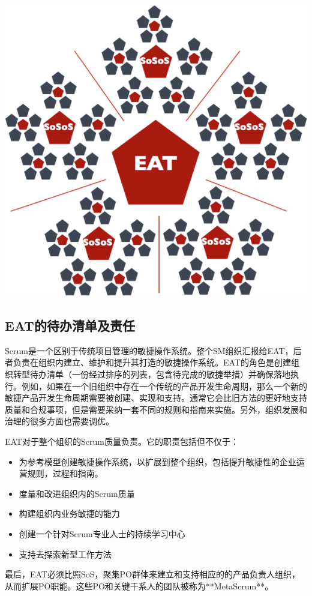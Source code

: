 \documentclass[12pt,a4paper,parskip=full]{scrartcl}
\begin{document}
\begin{CJK*}{UTF8}{gbsn}
\includegraphics[width=1.0\linewidth]{SoS-EAT.png}

\subsection{EAT的待办清单及责任}
Scrum是一个区别于传统项目管理的敏捷操作系统。整个SM组织汇报给EAT，后者负责在组织内建立、维护和提升其打造的敏捷操作系统。EAT的角色是创建组织转型待办清单（一份经过排序的列表，包含待完成的敏捷举措）并确保落地执行。例如，如果在一个旧组织中存在一个传统的产品开发生命周期，那么一个新的敏捷产品开发生命周期需要被创建、实现和支持。通常它会比旧方法的更好地支持质量和合规事项，但是需要采纳一套不同的规则和指南来实施。另外，组织发展和治理的很多方面也需要调优。

EAT对于整个组织的Scrum质量负责。它的职责包括但不仅于：
\begin{itemize}
\item 为参考模型创建敏捷操作系统，以扩展到整个组织，包括提升敏捷性的企业运营规则，过程和指南。
\item 度量和改进组织内的Scrum质量
\item 构建组织内业务敏捷的能力
\item 创建一个针对Scrum专业人士的持续学习中心
\item 支持去探索新型工作方法
\end{itemize}
最后，EAT必须比照SoS，聚集PO群体来建立和支持相应的的产品负责人组织，从而扩展PO职能。这些PO和关键干系人的团队被称为**MetaScrum**。


\end{CJK*}
\end{document}

